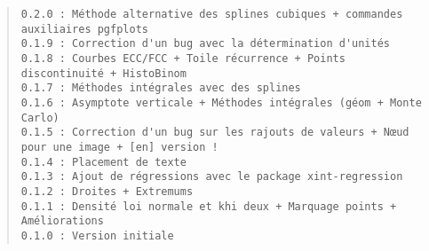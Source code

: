 \documentclass[11pt,a4paper]{ltxdoc}
\begin{document}
{\footnotesize \begin{quote}
\begin{verbatim}
0.2.0 : Méthode alternative des splines cubiques + commandes auxiliaires pgfplots
0.1.9 : Correction d'un bug avec la détermination d'unités
0.1.8 : Courbes ECC/FCC + Toile récurrence + Points discontinuité + HistoBinom
0.1.7 : Méthodes intégrales avec des splines
0.1.6 : Asymptote verticale + Méthodes intégrales (géom + Monte Carlo)
0.1.5 : Correction d'un bug sur les rajouts de valeurs + Nœud pour une image + [en] version !
0.1.4 : Placement de texte
0.1.3 : Ajout de régressions avec le package xint-regression
0.1.2 : Droites + Extremums
0.1.1 : Densité loi normale et khi deux + Marquage points + Améliorations
0.1.0 : Version initiale
\end{verbatim}
\end{quote}}
\end{document}
